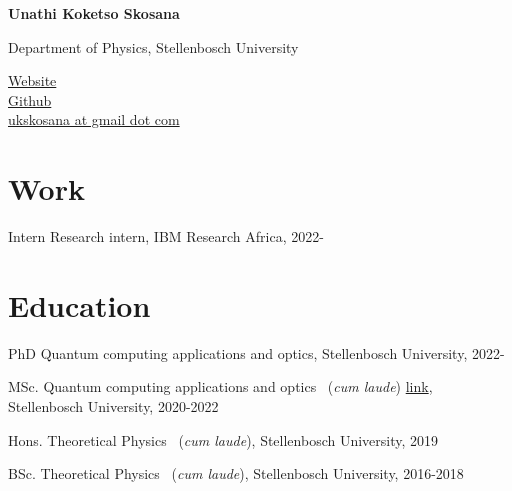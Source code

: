 \documentclass[12pt,letterpaper]{report}
\newcommand{\namefont}[1]{{\normalfont\bfseries\Huge{#1}}}
\newcommand*{\name}{
    Unathi Koketso Skosana
}
\begin{document}
	\raggedright{}

    \namefont{\name}

    \vspace{1em}
    \begin{minipage}[t]{0.700\textwidth}
        Department of Physics, Stellenbosch University
    \end{minipage}
    \begin{minipage}[t]{0.295\textwidth}
        \href{https://unathi.dev}{Website} \\
        \href{https://github.com/Unathi-Skosana}{Github} \\
        \href{mailto:ukskosana@gmail.com}{ukskosana at gmail dot com}
    \end{minipage}


  \section*{Work}
    \begin{tablist}
      \item[Intern]  \tab{}Research intern, IBM Research Africa, 2022-
    \end{tablist}


  \section*{Education}
    \begin{tablist}
        \item[PhD]  \tab{}Quantum computing applications and optics, Stellenbosch University, 2022-
        \item[MSc.]  \tab{}Quantum computing applications and optics
          ~(\textit{cum laude}) \href{https://github.com/Unathi-Skosana/mastersthesis}{link}, Stellenbosch University, 2020-2022
        \item[Hons.]  \tab{}Theoretical Physics ~(\textit{cum laude}),
          Stellenbosch University, 2019
        \item[BSc.]  \tab{}Theoretical Physics ~(\textit{cum laude}),
          Stellenbosch University, 2016-2018
    \end{tablist}
\end{document}
